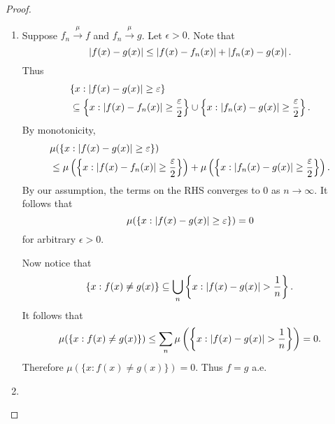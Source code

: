 \documentclass[notoc,notitlepage]{tufte-book}
\newcommand{\convmeas}{\overset{\mu}{\to}}
\begin{document}
\begin{proof}
  \begin{enumerate}
    \item Suppose $f_n \convmeas f$ and $f_n \convmeas g$.
      Let $\epsilon > 0$.
      Note that
      \begin{equation*}
        \left|f(x) - g(x)\right|
        \leq \left|f(x) - f_n(x)\right| + \left|f_n(x) - g(x)\right|.
      \end{equation*}
      Thus
      \begin{align*}
        &\{ x : \left|f(x) - g(x)\right| \geq \varepsilon \} \\
        &\subseteq \left\{ x : \left|f(x) - f_n(x)\right| \geq \frac{\varepsilon}{2} \right\}
          \cup \left\{ x : \left|f_n(x) - g(x)\right| \geq \frac{\varepsilon}{2} \right\}.
      \end{align*}
      By monotonicity,
      \begin{align*}
        &\mu(\{ x : \left|f(x) - g(x)\right| \geq \varepsilon \}) \\
        &\leq \mu\left( 
          \left\{ x : \left|f(x) - f_n(x)\right| \geq \frac{\varepsilon}{2} \right\}
        \right)
        + \mu\left( 
          \left\{ x : \left|f_n(x) - g(x)\right| \geq \frac{\varepsilon}{2} \right\}
        \right).
      \end{align*}
      By our assumption, the terms on the RHS converges to $0$
      as $n \to \infty$.
      It follows that
      \begin{equation*}
        \mu(\{ x : \left|f(x) - g(x)\right| \geq \varepsilon \}) = 0
      \end{equation*}
      for arbitrary $\epsilon > 0$.

      Now notice that
      \begin{equation*}
        \{ x : f(x) \neq g(x) \}
        \subseteq \bigcup_n \left\{ x : \left|f(x) - g(x)\right| > \frac{1}{n} \right\}.
      \end{equation*}
      It follows that
      \begin{equation*}
        \mu(\{ x : f(x) \neq g(x) \})
        \leq \sum_n \mu \left( 
          \left\{ x : \left|f(x) - g(x)\right| > \frac{1}{n} \right\}
        \right) = 0.
      \end{equation*}
      Therefore $\mu(\{ x : f(x) \neq g(x) \}) = 0$.
      Thus $f = g$ a.e.

    \item {}
  \end{enumerate}
\end{proof}
\end{document}
